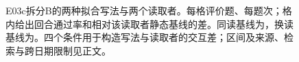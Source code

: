 \begin{figure}[htbp]
\centering

\caption{E03c拆分B的两种拟合写法与两个读取者。每格评价题、每题次；格内给出回合通过率和相对该读取者静态基线的差。同读基线为，换读基线为。四个条件用于构造写法与读取者的交互差；区间及来源、检索与跨日期限制见正文。}
\label{fig:ch15-reader}
\end{figure}
